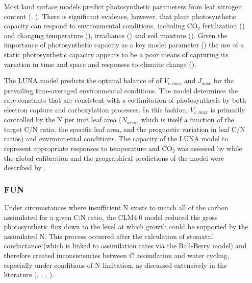 \documentclass[draft,linenumbers]{agujournal}
\begin{document}
Most land surface models predict photosynthetic parameters from leaf nitrogen content (\cite{kattge2009}, \cite{bonan2012}). There is significant evidence, however, that plant photosynthetic capacity can respond to environmental conditions, including CO$_{2}$ fertilization (\cite{ainsworth2007}) and changing temperature (\cite{hikosaka2005}), irradiance (\cite{niinemets1998}) and soil moisture (\cite{keenan2009}). Given the importance of photosynthetic capacity as a key model parameter (\cite{rogers2017}) the use of a static photosynthetic capacity appears to be a poor means of capturing its variation in time and space and responses to climatic change (\cite{walker2017}).


The LUNA model predicts the optimal balance of of $V_{c,max}$ and $J_{max}$ for the prevailing time-averaged environmental conditions. The model determines the rate constants that are consistent with a co-limitation of photosynthesis by both electron capture and carboxylation processes. In this fashion, $V_{c,max}$ is primarily controlled by the N per unit leaf area ($N_{area}$, which is itself a function of the target C/N ratio, the specific leaf area, and the prognostic variation in leaf C/N ratios) and environmental conditions. The capacity of the LUNA model to represent appropriate responses to temperature and CO$_{2}$ was assessed by \cite{xu2012} while the global calibration and the geographical predictions of the model were described by \cite{ali2016}.


\subsubsection{FUN}

Under circumstances where insufficient N exists to match all of the carbon assimilated for a given C:N ratio, the CLM4.0 model reduced the gross photosynthetic flux down to the level at which growth could be supported by the assimilated N. This process occurred after the calculation of stomatal conductance (which is linked to assimilation rates via the Ball-Berry model) and therefore created inconsistencies between C assimilation and water cycling, especially under conditions of N limitation, as discussed extensively in the literature (\cite{medlyn2011}, \cite{bonan2012}, \cite{dekauwe2014}, \cite{walker2014}).
\end{document}
